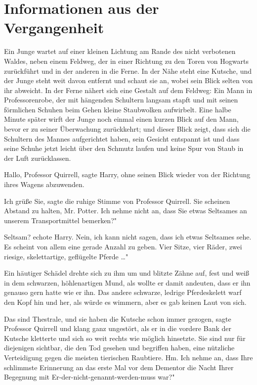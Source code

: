 \chapter{Informationen aus der Vergangenheit}

Ein Junge wartet auf einer kleinen Lichtung am Rande des nicht verbotenen
Waldes, neben einem Feldweg, der in einer Richtung zu den Toren von Hogwarts
zurückführt und in der anderen in die Ferne. In der Nähe steht eine Kutsche, und
der Junge steht weit davon entfernt und schaut sie an, wobei sein Blick selten
von ihr abweicht. In der Ferne nähert sich eine Gestalt auf dem Feldweg: Ein
Mann in Professorenrobe, der mit hängenden Schultern langsam stapft und mit
seinen förmlichen Schuhen beim Gehen kleine Staubwolken aufwirbelt. Eine halbe
Minute später wirft der Junge noch einmal einen kurzen Blick auf den Mann, bevor
er zu seiner Überwachung zurückkehrt; und dieser Blick zeigt, dass sich die
Schultern des Mannes aufgerichtet haben, sein Gesicht entspannt ist und dass
seine Schuhe jetzt leicht über den Schmutz laufen und keine Spur von Staub in
der Luft zurücklassen.

\glqq Hallo, Professor Quirrell\grqq{}, sagte Harry, ohne seinen Blick wieder
von der Richtung ihres Wagens abzuwenden.

\glqq Ich grüße Sie\grqq{}, sagte die ruhige Stimme von Professor Quirrell.
\glqq Sie scheinen Abstand zu halten, Mr. Potter. Ich nehme nicht an, dass Sie
etwas Seltsames an unserem Transportmittel bemerken?"

\glqq Seltsam?\grqq{} echote Harry. \glqq Nein, ich kann nicht sagen, dass ich
etwas Seltsames sehe. Es scheint von allem eine gerade Anzahl zu geben. Vier
Sitze, vier Räder, zwei riesige, skelettartige, geflügelte Pferde …"

Ein häutiger Schädel drehte sich zu ihm um und blitzte Zähne auf, fest und weiß
in dem schwarzen, höhlenartigen Mund, als wollte er damit andeuten, dass er ihn
genauso gern hatte wie er ihn. Das andere schwarze, ledrige Pferdeskelett warf
den Kopf hin und her, als würde es wimmern, aber es gab keinen Laut von sich.

\glqq Das sind Thestrale, und sie haben die Kutsche schon immer gezogen\grqq{},
sagte Professor Quirrell und klang ganz ungestört, als er in die vordere Bank
der Kutsche kletterte und sich so weit rechts wie möglich hinsetzte. \glqq Sie
sind nur für diejenigen sichtbar, die den Tod gesehen und begriffen haben, eine
nützliche Verteidigung gegen die meisten tierischen Raubtiere. Hm. Ich nehme an,
dass Ihre schlimmste Erinnerung an das erste Mal vor dem Dementor die Nacht
Ihrer Begegnung mit Er-der-nicht-genannt-werden-muss war?"

